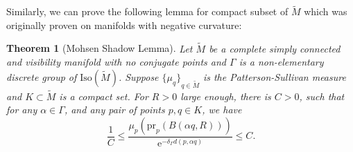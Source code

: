 \documentclass[reqno,11pt]{article}
\newtheorem{theorem}{Theorem}[section]
\theoremstyle{definition}
\theoremstyle{remark}
\numberwithin{equation}{section}
\begin{document}
Similarly, we can prove the following lemma for compact subset of $\widetilde{M}$ which was originally proven on manifolds with negative curvature:

\begin{theorem}[Mohsen Shadow Lemma\cite{PPS}]\label{thm_4_5}
	Let $\widetilde{M}$ be a complete simply connected and visibility manifold with no conjugate points and $\Gamma$ is a non-elementary discrete group of $\text{Iso}(\widetilde{M})$. Suppose ${\{\mu_q\}}_{q\in\widetilde{M}}$ is the Patterson-Sullivan measure and $K\subset\widetilde{M}$ is a compact set.
	For $R>0$ large enough, there is $C>0$, such that for any $\alpha\in\Gamma$, and any pair of points $p,q\in K$, we have
	\begin{displaymath}
		\frac 1C\leq \frac{\mu_p(\text{pr}_p(B(\alpha q,R)))}{\mathrm{e}^{-\delta_\Gamma d(p,\alpha q)}}\leq C.
	\end{displaymath}
\end{theorem}
\end{document}
